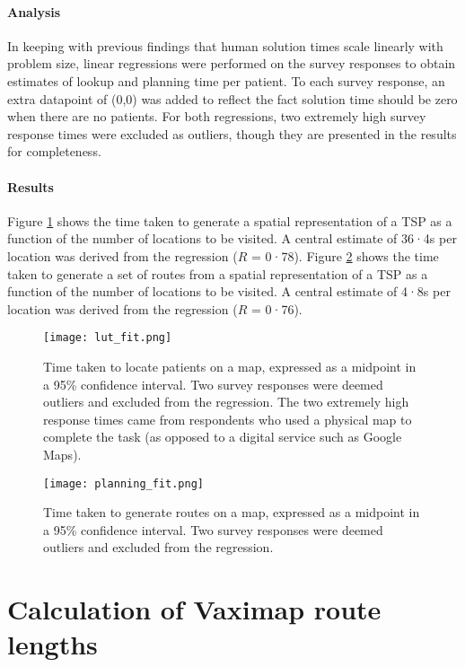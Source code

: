 \documentclass{article}
\def\vm{Vaximap}
\begin{document}
\paragraph{Analysis} In keeping with previous findings that human solution times scale linearly with problem size, linear regressions were performed on the survey responses to obtain estimates of lookup and planning time per patient. To each survey response, an extra datapoint of (0,0) was added to reflect the fact solution time should be zero when there are no patients. For both regressions, two extremely high survey response times were excluded as outliers, though they are presented in the results for completeness. 

\paragraph{Results} Figure \ref{lut_fit} shows the time taken to generate a spatial representation of a TSP as a function of the number of locations to be visited. A central estimate of 36·4s per location was derived from the regression ($R$ = 0·78). Figure \ref{planning_fit} shows the time taken to generate a set of routes from a spatial representation of a TSP as a function of the number of locations to be visited. A central estimate of 4·8s per location was derived from the regression ($R$ = 0·76). 

\begin{figure}[H]
\centering
\texttt{[image: lut\_fit.png]}
\caption{Time taken to locate patients on a map, expressed as a midpoint in a 95\% confidence interval. Two survey responses were deemed outliers and excluded from the regression. The two extremely high response times came from respondents who used a physical map to complete the task (as opposed to a digital service such as Google Maps).}
\label{lut_fit}
\end{figure}

\begin{figure}[H]
\centering
\texttt{[image: planning\_fit.png]}
\caption{Time taken to generate routes on a map, expressed as a midpoint in a 95\% confidence interval. Two survey responses were deemed outliers and excluded from the regression.}
\label{planning_fit}
\end{figure}

\section{Calculation of \vm{} route lengths}
\end{document}
